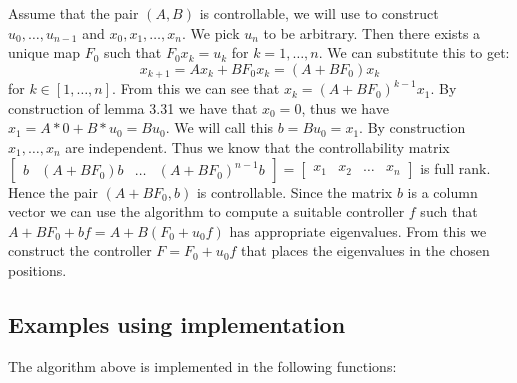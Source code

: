 
Assume that the pair $(A,B)$ is controllable, we will use \cite[Lemma 3.31]{bookTrentelman} to construct $u_0, \dots , u_{n-1}$ and $x_0,x_1, \dots ,x_n$. We pick $u_n$ to be arbitrary. Then there exists a unique map $F_0$ such that $F_0 x_k = u_k$ for $k = 1,\dots,n$. We can substitute this to get:
\[ x_{k+1} = Ax_k + BF_0 x_k = (A + BF_0 ) x_k \]
for $k \in [1, \dots, n]$. From this we can see that $x_k = (A+BF_0)^{k-1} x_1$. By construction of lemma 3.31 we have that $x_0 = 0$, thus we have $x_1 = A * 0 + B * u_0 = Bu_0$. We will call this $b = Bu_0 = x_1$. By construction $x_1,\dots,x_n$ are independent. Thus we know that the controllability matrix $\begin{bmatrix}b&(A+BF_0)b&\dots&(A+BF_0)^{n-1}b\end{bmatrix} = \begin{bmatrix}x_1&x_2&\dots&x_n\end{bmatrix}$ is full rank. Hence the pair $(A+BF_0,b)$ is controllable. Since the matrix $b$ is a column vector we can use the  algorithm to compute a suitable controller $f$ such that $A+BF_0 + bf = A + B(F_0 + u_0 f)$ has appropriate eigenvalues. From this we construct the controller $F = F_0 + u_0 f$ that places the eigenvalues in the chosen positions.


\subsection{Examples using implementation}
The algorithm above is implemented in the following functions:
